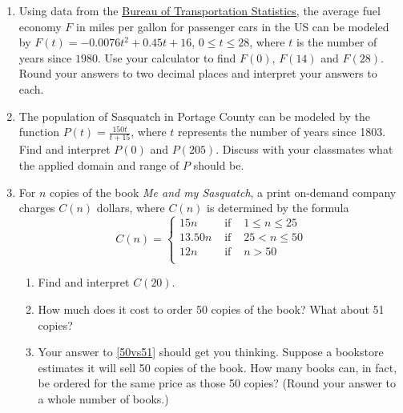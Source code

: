 {\begin{enumerate}
\item Using data from the  \href{http://www.bts.gov/publications/national_transportation_statistics/html/table_04_23.html}{\underline{Bureau of Transportation Statistics}}, the average fuel economy $F$ in miles per gallon for passenger cars in the US can be modeled by  $F(t) = -0.0076t^2+0.45t + 16$, $0 \leq t \leq 28$, where $t$ is the number of years since $1980$. Use your calculator to find $F(0)$, $F(14)$ and $F(28)$.  Round your answers to two decimal places and interpret your answers to each.


\item The population of Sasquatch in Portage County can be modeled by the function $P(t) = \frac{150t}{t + 15}$, where $t$ represents the number of  years since 1803.  Find and interpret $P(0)$ and $P(205)$.  Discuss with your classmates what the applied domain and range of $P$ should be.

\label{Sasquatchfunc1}

\item \label{piecewiseordering} For $n$ copies of the book \textit{Me and my Sasquatch}, a print on-demand company charges $C(n)$ dollars, where $C(n)$ is determined by the formula \[{\displaystyle C(n) = \left\{ \begin{array}{rcl}  15n & \mbox{ if } & 1 \leq n \leq 25  \\
                                                            13.50n  & \mbox{ if } & 25 < n \leq 50 \\
                                                            12n & \mbox{ if } & n > 50 \\
                                     \end{array} \right. }\]
                                     
                                     
\begin{enumerate}

\item  Find and interpret $C(20)$.  %

\item  \label{50vs51} How much does it cost to order 50 copies of the book?  What about 51 copies? %

\item  Your answer to \ref{50vs51} should get you thinking. Suppose a bookstore estimates it will sell 50 copies of the book.  How many books can, in fact, be ordered for the same price as those 50 copies? (Round your answer to a  whole number of books.)  %


\end{enumerate}
\end{enumerate}}
